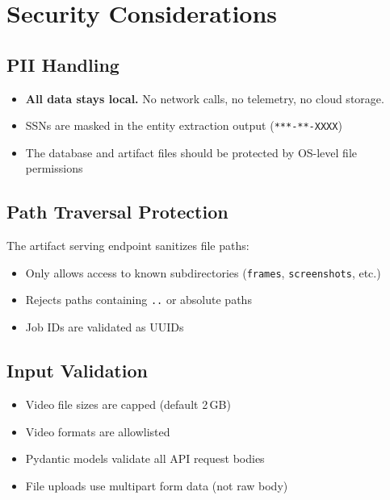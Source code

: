 \documentclass[12pt, a4paper]{article}
\newcommand{\codeinline}[1]{\texttt{\small\colorbox{codebg}{#1}}}
\begin{document}
\section{Security Considerations}

\subsection{PII Handling}

\begin{itemize}
    \item \textbf{All data stays local.} No network calls, no telemetry, no cloud storage.
    \item SSNs are masked in the entity extraction output (\codeinline{***-**-XXXX})
    \item The database and artifact files should be protected by OS-level file permissions
\end{itemize}

\subsection{Path Traversal Protection}

The artifact serving endpoint sanitizes file paths:
\begin{itemize}
    \item Only allows access to known subdirectories (\codeinline{frames}, \codeinline{screenshots}, etc.)
    \item Rejects paths containing \codeinline{..} or absolute paths
    \item Job IDs are validated as UUIDs
\end{itemize}

\subsection{Input Validation}

\begin{itemize}
    \item Video file sizes are capped (default 2\,GB)
    \item Video formats are allowlisted
    \item Pydantic models validate all API request bodies
    \item File uploads use multipart form data (not raw body)
\end{itemize}
\end{document}
